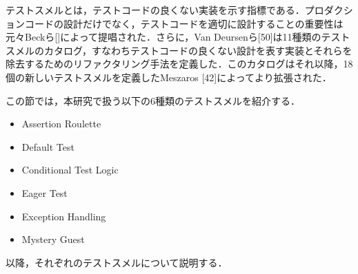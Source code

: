 \documentclass[12pt]{jarticle} %
\begin{document}
テストスメルとは，テストコードの良くない実装を示す指標である．プロダクションコードの設計だけでなく，テストコードを適切に設計することの重要性は元々Beckら[]によって提唱された．さらに，Van Deursenら[50]は11種類のテストスメルのカタログ，すなわちテストコードの良くない設計を表す実装とそれらを除去するためのリファクタリング手法を定義した．このカタログはそれ以降，18個の新しいテストスメルを定義したMeszaros [42]によってより拡張された．

この節では，本研究で扱う以下の6種類のテストスメルを紹介する．

\begin{itemize}
\item Assertion Roulette
\item Default Test
\item Conditional Test Logic
\item Eager Test
\item Exception Handling
\item Mystery Guest
\end{itemize}

以降，それぞれのテストスメルについて説明する．
\end{document}
